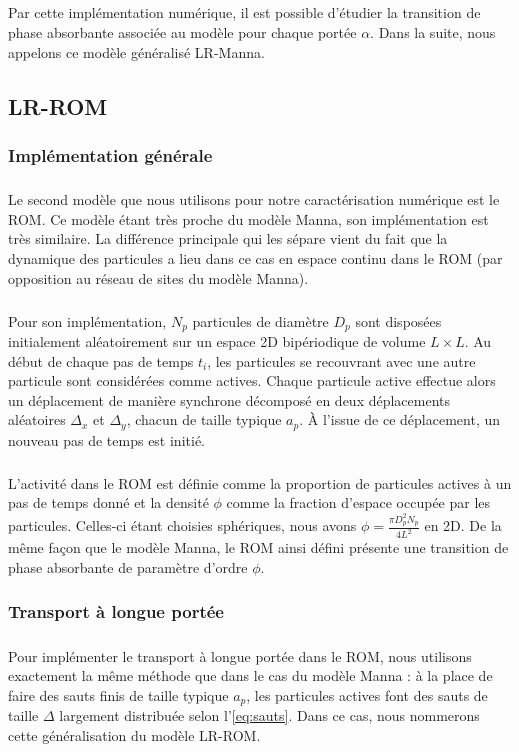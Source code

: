 \subparagraph{}Par cette implémentation numérique, il est possible d'étudier la transition de phase absorbante associée au modèle pour chaque portée $\alpha$. Dans la suite, nous appelons ce modèle généralisé LR-Manna.

\subsection{LR-ROM}

\label{sec:implementation_ROM}

\subsubsection{Implémentation générale}

\subparagraph{}Le second modèle que nous utilisons pour notre caractérisation numérique est le ROM. Ce modèle étant très proche du modèle Manna, son implémentation est très similaire. La différence principale qui les sépare vient du fait que la dynamique des particules a lieu dans ce cas en espace continu dans le ROM (par opposition au réseau de sites du modèle Manna). 

\subparagraph{}Pour son implémentation, $N_p$ particules de diamètre $D_p$ sont disposées initialement aléatoirement sur un espace 2D bipériodique de volume $L\times L$. Au début de chaque pas de temps $t_i$, les particules se recouvrant avec une autre particule sont considérées comme actives. Chaque particule active effectue alors un déplacement de manière synchrone décomposé en deux déplacements aléatoires $\Delta_x$ et $\Delta_y$, chacun de taille typique $a_p$. \`A l'issue de ce déplacement, un nouveau pas de temps est initié.

\subparagraph{}L'activité dans le ROM est définie comme la proportion de particules actives à un pas de temps donné et la densité $\phi$ comme la fraction d'espace occupée par les particules. Celles-ci étant choisies sphériques, nous avons $\phi = \frac{\pi D_p^2 N_p}{4 L^2}$ en 2D. De la même façon que le modèle Manna, le ROM ainsi défini présente une transition de phase absorbante de paramètre d'ordre $\phi$.

\subsubsection{Transport à longue portée}

\subparagraph{}Pour implémenter le transport à longue portée dans le ROM, nous utilisons exactement la même méthode que dans le cas du modèle Manna : à la place de faire des sauts finis de taille typique $a_p$, les particules actives font des sauts de taille $\Delta$ largement distribuée selon l'\autoref{eq:sauts}. Dans ce cas, nous nommerons cette généralisation du modèle LR-ROM.

